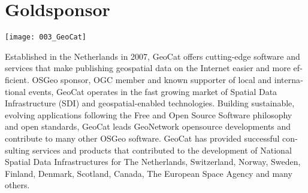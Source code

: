\section*{Goldsponsor}
\begin{center}
  \texttt{[image: 003\_GeoCat]}
\end{center}
\begin{otherlanguage}{english}
  Established in the Netherlands in 2007, GeoCat offers cutting-edge software and services that make
  publishing geospatial data on the Internet easier and more efficient. OSGeo sponsor, OGC member and
  known supporter of local and international events, GeoCat operates in the fast growing market of
  Spatial Data Infrastructure (SDI) and geospatial-enabled technologies. Building sustainable,
  evolving applications following the Free and Open Source Software philosophy and open standards,
  GeoCat leads GeoNetwork opensource developments and contri\-bute to many other OSGeo software. GeoCat
  has provided successful consulting services and products that contributed to the development of
  National Spatial Data Infrastructures for The Netherlands, Switzerland, Norway, Sweden, Finland,
  Denmark, Scotland, Canada, The European Space Agency and many others.
\end{otherlanguage}
